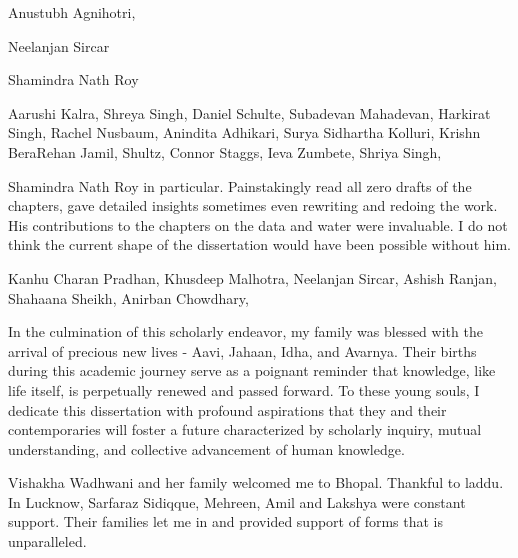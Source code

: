 Anustubh Agnihotri, 

Neelanjan Sircar 

Shamindra Nath Roy 

Aarushi Kalra, Shreya Singh, Daniel Schulte, Subadevan Mahadevan, Harkirat Singh, Rachel Nusbaum, Anindita Adhikari, Surya Sidhartha Kolluri, Krishn BeraRehan Jamil, Shultz, Connor Staggs, Ieva Zumbete, Shriya Singh, 

Shamindra Nath Roy in particular. Painstakingly read all zero drafts of the chapters, gave detailed insights sometimes even rewriting and redoing the work. His contributions to the chapters on the data and water were invaluable. I do not think the current shape of the dissertation would have been possible without him. 

Kanhu Charan Pradhan, Khusdeep Malhotra, Neelanjan Sircar, Ashish Ranjan, Shahaana Sheikh, Anirban Chowdhary, 


In the culmination of this scholarly endeavor, my family was blessed with the arrival of precious new lives - Aavi, Jahaan, Idha, and Avarnya. Their births during this academic journey serve as a poignant reminder that knowledge, like life itself, is perpetually renewed and passed forward. To these young souls, I dedicate this dissertation with profound aspirations that they and their contemporaries will foster a future characterized by scholarly inquiry, mutual understanding, and collective advancement of human knowledge.

Vishakha Wadhwani and her family welcomed me to Bhopal. Thankful to laddu. In Lucknow, Sarfaraz Sidiqque, Mehreen, Amil and Lakshya were constant support. Their families let me in and provided support of forms that is unparalleled.  